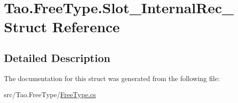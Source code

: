 \hypertarget{struct_tao_1_1_free_type_1_1_slot___internal_rec__}{
\section{Tao.FreeType.Slot\_\-InternalRec\_\- Struct Reference}
\label{struct_tao_1_1_free_type_1_1_slot___internal_rec__}
}


\subsection{Detailed Description}


The documentation for this struct was generated from the following file:\begin{DoxyCompactItemize}
\item 
src/Tao.FreeType/\hyperlink{_free_type_8cs}{FreeType.cs}\end{DoxyCompactItemize}
